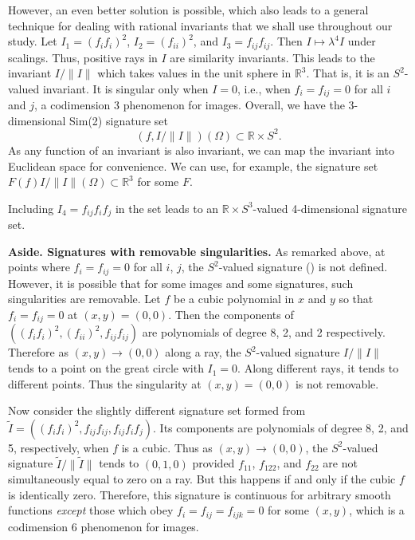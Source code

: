 \documentclass{article}
\begin{document}
However, an even better solution is possible, which also leads to a general technique for
dealing with rational invariants that we shall use throughout our study. 
Let $I_1=(f_i f_i)^2$, $I_2=(f_{ii})^2$, and $I_3=f_{ij}f_{ij}$. Then $I\mapsto \lambda^4 I$ under scalings.
Thus, positive rays in $I$ are similarity invariants. This leads to the invariant $I/\|I\|$ which
takes values in the unit sphere in $\mathbb{R}^3$. That is, it is an $S^2$-valued invariant.
It is singular only when $I=0$, i.e., when $f_i = f_{ij}=0$ for all $i$ and $j$, a codimension
3 phenomenon for images. Overall, we have the 3-dimensional Sim(2) signature set
$$(f,I/\|I\|)(\Omega)\subset \mathbb{R}\times S^2.$$
As any function of an invariant is also invariant, we can map the invariant into Euclidean space for convenience.
We can use, for example, the signature set $F(f)I/\|I\|(\Omega)\subset\mathbb{R}^3$ for some $F$.

Including $I_4=f_{ij}f_if_j$ in the set leads to an $\mathbb{R}\times S^3$-valued 4-dimensional signature set.

\medskip

{\narrower\small

{\bf Aside. Signatures with removable singularities.} As remarked above, at points
where $f_i=f_{ij}=0$ for all $i$, $j$, the $S^2$-valued signature () is not defined. However,
it is possible that for some images and some signatures, such singularities are removable.
Let $f$ be a cubic polynomial in $x$ and $y$ so that $f_i=f_{ij}=0$ at $(x,y)=(0,0)$.
Then the components of $((f_if_i)^2,(f_{ii})^2, f_{ij}f_{ij})$ are polynomials
of degree 8, 2, and 2 respectively. Therefore as $(x,y)\to(0,0)$ along a ray,
the $S^2$-valued signature $I/\|I\|$ tends to a point on the great circle with $I_1=0$. Along
different rays, it tends to different points. Thus the singularity at $(x,y)=(0,0)$ is not removable.

Now consider the slightly different signature set formed from 
$\tilde I = ((f_if_i)^2, f_{ij}f_{ij}, f_{ij}f_i f_j)$. 
Its components are polynomials of degree 8, 2, and 5, respectively, when $f$ is a cubic. Thus
as $(x,y)\to(0,0)$, the $S^2$-valued signature $\tilde I/\|\tilde I\|$ tends to
$(0,1,0)$ provided $f_{11}$, $f_{122}$, and $f_{22}$ are not simultaneously equal
to zero on a ray. But this happens if and only if the cubic $f$ is identically zero.
Therefore, this signature is continuous for arbitrary smooth functions
{\em except} those which obey $f_i = f_{ij}=f_{ijk}=0$ for some $(x,y)$,
which is a codimension 6 phenomenon for images.

}
\end{document}
